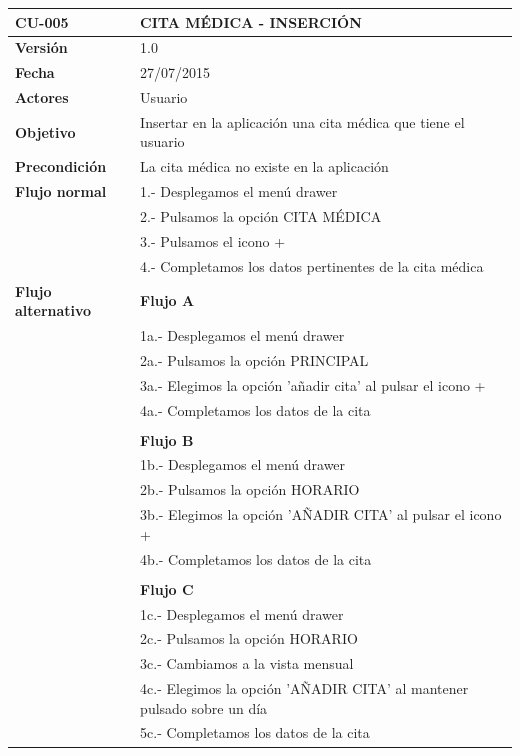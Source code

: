 \documentclass[../pfc.tex]{subfiles}
\begin{document}
	\begin{table}[H]
		\centering
		\begin{tabular}[t]{|p{3cm}|p{9.5cm}|}
			\hline \textbf{CU-005} & \textbf{CITA MÉDICA - INSERCIÓN} \\*
			\hline\hline \textbf{Versión} & 1.0 \\*
			\hline\hline \textbf{Fecha} & 27/07/2015 \\*
			\hline\textbf{Actores} 	& Usuario\\*
			\hline \textbf{Objetivo} & Insertar en la aplicación una cita médica que tiene el usuario\\* 			
			\hline \textbf{Precondición} & La cita médica no existe en la aplicación\\* 
			\hline \textbf{Flujo normal} & 1.- Desplegamos el menú drawer \\* 
			& 2.- Pulsamos la opción CITA MÉDICA\\*	
			& 3.- Pulsamos el icono +\\*	
			& 4.- Completamos los datos pertinentes de la cita médica\\*	
			\hline \textbf{Flujo alternativo} & \textbf{Flujo A} \\* 
			& 1a.- Desplegamos el menú drawer \\* 
			& 2a.- Pulsamos la opción PRINCIPAL \\*	
			& 3a.- Elegimos la opción 'añadir cita' al pulsar el icono +\\*	
			& 4a.- Completamos los datos de la cita\\*	
			& \\*	
			& \textbf{Flujo B} \\* 
			& 1b.- Desplegamos el menú drawer \\* 
			& 2b.- Pulsamos la opción HORARIO \\*	
			& 3b.- Elegimos la opción 'AÑADIR CITA' al pulsar el icono +\\*	
			& 4b.- Completamos los datos de la cita\\*	
			& \\*	
			& \textbf{Flujo C} \\* 
			& 1c.- Desplegamos el menú drawer \\* 
			& 2c.- Pulsamos la opción HORARIO \\*	
			& 3c.- Cambiamos a la vista mensual \\*	
			& 4c.- Elegimos la opción 'AÑADIR CITA' al mantener pulsado sobre un día\\*	
			& 5c.- Completamos los datos de la cita\\*	

\end{tabular}
\end{table}
\end{document}
